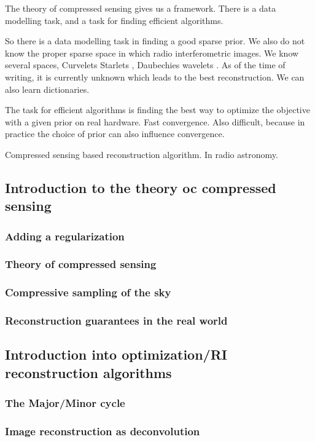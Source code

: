 The theory of compressed sensing gives us a framework. There is a data modelling task, and a task for finding efficient algorithms.

So there is a data modelling task in finding a good sparse prior.
We also do not know the proper sparse space in which radio interferometric images. We know several spaces, Curvelets \cite{starck2003astronomical} Starlets \cite{starck2015starlet}, Daubechies wavelets \cite{carrillo2012sparsity}. As of the time of writing, it is currently unknown which leads to the best reconstruction.
We can also learn dictionaries.

The task for efficient algorithms is finding the best way to optimize the objective with a given prior on real hardware. Fast convergence. Also difficult, because in practice the choice of prior can also influence convergence.


Compressed sensing based reconstruction algorithm. In radio astronomy.






\subsection{Introduction to the theory oc compressed sensing}

\subsubsection{Adding a regularization}

\subsubsection{Theory of compressed sensing}

\subsubsection{Compressive sampling of the sky}

\subsubsection{Reconstruction guarantees in the real world}







\subsection{Introduction into optimization/RI reconstruction algorithms}\label{intro2:rec}

\subsubsection{The Major/Minor cycle}

\subsubsection{Image reconstruction as deconvolution}
